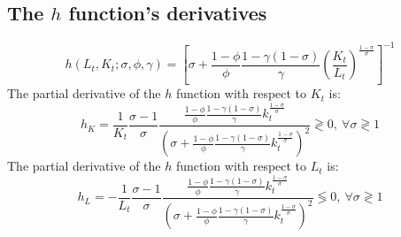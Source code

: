 \documentclass[
]{article}
\begin{document}
\hypertarget{the-h-functions-derivatives}{%
\subsection{\texorpdfstring{The \(h\) function's derivatives}{The h function's derivatives}}\label{the-h-functions-derivatives}}

\begin{equation*}
    h(L_t, K_t; \sigma, \phi, \gamma) = \left[ \sigma + \frac{1-\phi}{\phi} \frac{1-\gamma(1-\sigma)}{\gamma} \left(\frac{K_t}{L_t}\right)^{\frac{1-\sigma}{\sigma}} \right]^{-1}
\end{equation*}
The partial derivative of the \(h\) function with respect to \(K_t\) is:
\begin{equation*}
    h_K = \frac{1}{K_t}\frac{\sigma-1}{\sigma}\frac{\frac{1-\phi}{\phi}\frac{1-\gamma(1-\sigma)}{\gamma}k_t^{\frac{1-\sigma}{\sigma}}}{\left(\sigma + \frac{1-\phi}{\phi}\frac{1-\gamma(1-\sigma)}{\gamma}k_t^{\frac{1-\sigma}{\sigma}}\right)^2} \gtrless 0,~\forall \sigma \gtrless 1
\end{equation*}
The partial derivative of the \(h\) function with respect to \(L_t\) is:
\begin{equation*}
    h_L = -\frac{1}{L_t}\frac{\sigma-1}{\sigma}\frac{\frac{1-\phi}{\phi}\frac{1-\gamma(1-\sigma)}{\gamma}k_t^{\frac{1-\sigma}{\sigma}}}{\left(\sigma + \frac{1-\phi}{\phi}\frac{1-\gamma(1-\sigma)}{\gamma}k_t^{\frac{1-\sigma}{\sigma}}\right)^2} \lessgtr 0,~\forall \sigma \gtrless 1
\end{equation*}

  
\end{document}
